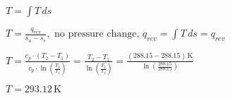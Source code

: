 \( T = \int T \, ds \)  

\( T = \frac{q_{rev}}{s_a - s_e}, \text{ no pressure change, } q_{rev} = \int T \, ds = q_{rev} \)  

\( T = \frac{c_p \cdot (T_2 - T_1)}{c_p \cdot \ln \left( \frac{T_2}{T_1} \right)} = \frac{T_2 - T_1}{\ln \left( \frac{T_2}{T_1} \right)} = \frac{(288.15 - 288.15) \, \text{K}}{\ln \left( \frac{288.15}{288.15} \right)} \)  

\( T = 293.12 \, \text{K} \)